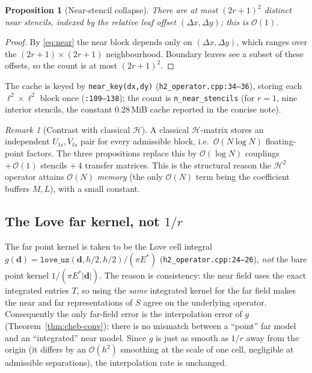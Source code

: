 \documentclass[11pt,a4paper]{article}
\newcommand{\Es}{E^{*}}
\newcommand{\Order}{\mathcal{O}}
\newcommand{\abs}[1]{\left\lvert #1 \right\rvert}
\newcommand{\Htwo}{\mathcal{H}^2}
\newcommand{\Hmat}{\mathcal{H}}
\newcommand{\code}[1]{\texttt{#1}}
\newtheorem{proposition}{Proposition}
\theoremstyle{definition}
\theoremstyle{remark}
\newtheorem{remark}{Remark}
\begin{document}
\begin{proposition}[Near-stencil collapse]
\label{prop:near-cache}
There are at most $(2r+1)^2$ distinct near stencils, indexed by the relative leaf
offset $(\Delta x,\Delta y)$; this is $\Order(1)$.
\end{proposition}
\begin{proof}
By \eqref{eq:near} the near block depends only on $(\Delta x,\Delta y)$, which
ranges over the $(2r+1)\times(2r+1)$ neighbourhood. Boundary leaves see a subset
of these offsets, so the count is at most $(2r+1)^2$.
\end{proof}
The cache is keyed by \code{near\_key(dx,dy)} (\code{h2\_operator.cpp:34--36}),
storing each $\ell^2\times\ell^2$ block once (\code{:109--138}); the count is
\code{n\_near\_stencils} (for $r=1$, nine interior stencils, the constant
$0.28$\,MiB cache reported in the concise note).

\begin{remark}[Contrast with classical $\Hmat$]
A classical $\Hmat$-matrix stores an independent $U_{ts},V_{ts}$ pair for every
admissible block, i.e.\ $\Order(N\log N)$ floating-point factors. The three
propositions replace this by $\Order(\log N)$ couplings $+\,\Order(1)$ stencils
$+\,4$ transfer matrices. This is the structural reason the $\Htwo$ operator
attains $\Order(N)$ \emph{memory} (the only $\Order(N)$ term being the
coefficient buffers $M,L$), with a small constant.
\end{remark}

\subsection{The Love far kernel, not $1/r$}
\label{sec:lovefar}

The far point kernel is taken to be the Love cell integral
$g(\mathbf d)=\code{love\_uz}(\mathbf d,h/2,h/2)/(\pi\Es)$
(\code{h2\_operator.cpp:24--26}), \emph{not} the bare point kernel
$1/(\pi\Es\abs{\mathbf d})$. The reason is consistency: the near field uses the
exact integrated entries $T$, so using the \emph{same} integrated kernel for the
far field makes the near and far representations of $S$ agree on the underlying
operator. Consequently the only far-field error is the interpolation error of
$g$ (Theorem~\ref{thm:cheb-conv}); there is no mismatch between a ``point'' far
model and an ``integrated'' near model. Since $g$ is just as smooth as $1/r$ away
from the origin (it differs by an $\Order(h^2)$ smoothing at the scale of one
cell, negligible at admissible separations), the interpolation rate is unchanged.
\end{document}
